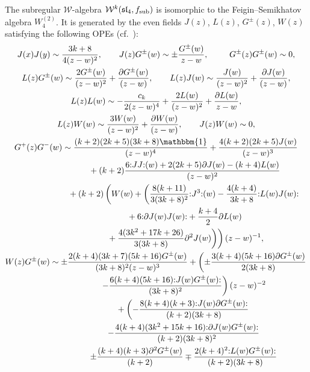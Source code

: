 \documentclass[11pt]{article}
\numberwithin{equation}{section}
\begin{document}
 The subregular $\mathcal{W}$-algebra $\mathcal{W}^{k}(\mathfrak{sl}_4, f_{\rm sub})$ is isomorphic to the Feigin--Semikhatov algebra $W^{(2)}_4$. It is generated by the even fields $J(z)$, $L(z)$, $G^{\pm}(z)$, $W(z)$ satisfying the following OPEs (cf.~\cite{FS}):
 \begin{gather*}
 J(x)J(y) \sim \frac{3k+8}{4(z-w)^{2}}, \qquad
 J(z)G^{\pm}(w) \sim \pm \frac{G^{\pm}(w)}{z-w} , \enskip \qquad G^{\pm}(z)G^{\pm}(w) \sim0, \\
	L(z)G^{\pm}(w) \sim \frac{2G^{\pm}(w)}{(z-w)^{2}} + \frac{\partial G^{\pm}(w)}{(z-w)}, \qquad
	L(z)J(w) \sim \frac{J(w)}{(z-w)^{2}} + \frac{\partial J(w)}{(z-w)}, \\
	L(z)L(w) \sim - \frac{c_k}{2(z-w)^{4}}+ \frac{2L(w)}{(z-w)^{2}}+ \frac{\partial L(w)}{z-w}, \\
	L(z) W(w) \sim \frac{3 W(w)}{(z-w)^{2}} + \frac{ \partial W(w)}{(z-w)}, \qquad J(z) W(w) \sim 0,
\\
	G^+(z)G^-(w) \sim \frac{(k+2)(2k+5)(3k+8)\mathbbm{1}}{(z-w)^{4}}+ \frac{4(k+2)(2k+5)J(w)}{ (z-w)^{3}} \\
	\phantom{	G^+(z)G^-(w) \sim }{} + (k+2) \frac{6 {:}JJ{:}(w) +2(2k+5)\partial J(w)-(k+4)L(w)}{(z-w)^{2}} \\
		\phantom{	G^+(z)G^-(w) \sim }{} + (k+2)\left( W(w) + \left(\frac{8(k+11)}{3(3k+8)^2}{:}J^3{:}(w)-\frac{4(k+4)}{3k+8}{:}L(w)J(w){:}\right.\right.\\
\left.\left.\phantom{	G^+(z)G^-(w) \sim }{}+ 6{:}\partial J(w)J(w){:}	 + \frac{k+4}{2}\partial L(w)\right.\right. \\
\left.\left.\phantom{	G^+(z)G^-(w) \sim }{}+ \frac{4(3k^2+17k+26)}{3(3k+8)}\partial ^2J(w)\right)\right)(z-w)^{-1},
\\
	 W(z)G^{\pm}(w) \sim \pm\frac{2(k+4)(3k+7)(5k+16)G^{\pm}(w)}{(3k+8)^2(z-w)^{3}}+ \left(\pm\frac{3(k+4)(5k+16)\partial G^{\pm}(w)}{2(3k+8)} \right. \\
\phantom{ W(z)G^{\pm}(w) \sim }{}	 \left. -\frac{6(k+4)(5k+16){:}J(w)G^{\pm}(w){:} }{(3k+8)^2}\right)(z-w)^{-2} \\
\phantom{ W(z)G^{\pm}(w) \sim }{}+\left(-\frac{8(k+4)(k+3){:}J(w)\partial G^{\pm}(w){:}}{(k+2)(3k+8)} \right. \\
\phantom{ W(z)G^{\pm}(w) \sim }{}	 \left. - \frac{4(k+4)(3k^2+15k+16){:}\partial J(w)G^{\pm}(w){:}}{(k+2)(3k+8)^2}\right.\\
 \phantom{ W(z)G^{\pm}(w) \sim }{}\left. \pm \frac{(k+4)(k+3)\partial ^2G^{\pm}(w)}{(k+2)}\mp \frac{2(k+4)^2{:}L(w)G^{\pm}(w){:}}{(k+2)(3k+8)}\right. \\

\end{gather*}
\end{document}

